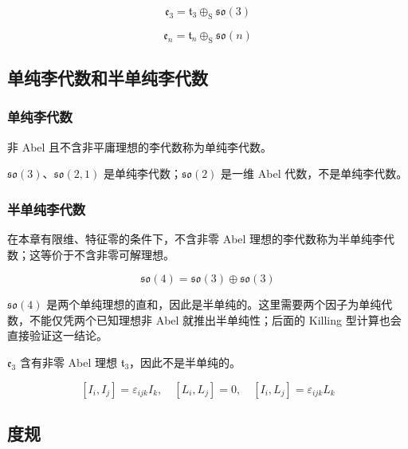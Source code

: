 \begin{equation}
\mathfrak{e}_3=\mathfrak{t}_3\oplus_{\mathrm{S}} \mathfrak{so}\left(3\right)
\end{equation}

\begin{equation}
\mathfrak{e}_n=\mathfrak{t}_n\oplus_{\mathrm{S}} \mathfrak{so}\left(n\right)
\end{equation}

\subsection{单纯李代数和半单纯李代数}

\subsubsection*{单纯李代数}

非 Abel 且不含非平庸理想的李代数称为单纯李代数。

$\mathfrak{so}\left(3\right)$、$\mathfrak{so}\left(2,1\right)$ 是单纯李代数；$\mathfrak{so}\left(2\right)$ 是一维 Abel 代数，不是单纯李代数。

\subsubsection*{半单纯李代数}

在本章有限维、特征零的条件下，不含非零 Abel 理想的李代数称为半单纯李代数；这等价于不含非零可解理想。

\begin{equation}
\mathfrak{so}\left(4\right) = \mathfrak{so}\left(3\right)\oplus\mathfrak{so}\left(3\right)
\end{equation}

$\mathfrak{so}\left(4\right)$ 是两个单纯理想的直和，因此是半单纯的。这里需要两个因子为单纯代数，不能仅凭两个已知理想非 Abel 就推出半单纯性；后面的 Killing 型计算也会直接验证这一结论。

$\mathfrak{e}_3$ 含有非零 Abel 理想 $\mathfrak{t}_3$，因此不是半单纯的。

\begin{equation}
\left[I_i,I_j \right]=\varepsilon_{ijk}I_k,\quad
\left[L_i,L_j \right]=0,\quad
\left[I_i,L_j \right]=\varepsilon_{ijk}L_k
\end{equation}

\subsection{度规}

